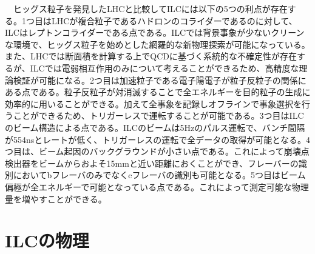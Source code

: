 　ヒッグス粒子を発見したLHCと比較してILCには以下の5つの利点が存在する。1つ目はLHCが複合粒子であるハドロンのコライダーであるのに対して、ILCはレプトンコライダーである点である。ILCでは背景事象が少ないクリーンな環境で、ヒッグス粒子を始めとした網羅的な新物理探索が可能になっている。また、LHCでは断面積を計算する上でQCDに基づく系統的な不確定性が存在するが、ILCでは電弱相互作用のみについて考えることができるため、高精度な理論検証が可能になる。2つ目は加速粒子である電子陽電子が粒子反粒子の関係にある点である。粒子反粒子が対消滅することで全エネルギーを目的粒子の生成に効率的に用いることができる。加えて全事象を記録しオフラインで事象選択を行うことができるため、トリガーレスで運転することが可能である。3つ目はILCのビーム構造による点である。ILCのビームは5Hzのパルス運転で、バンチ間隔が554nsとレートが低く、トリガーレスの運転で全データの取得が可能となる。4つ目は、ビーム起因のバックグラウンドが小さい点である。これによって崩壊点検出器をビームからおよそ15mmと近い距離におくことができ、フレーバーの識別においてbフレーバのみでなくcフレーバの識別も可能となる。5つ目はビーム偏極が全エネルギーで可能となっている点である。これによって測定可能な物理量を増やすことができる。
\section{ILCの物理}
